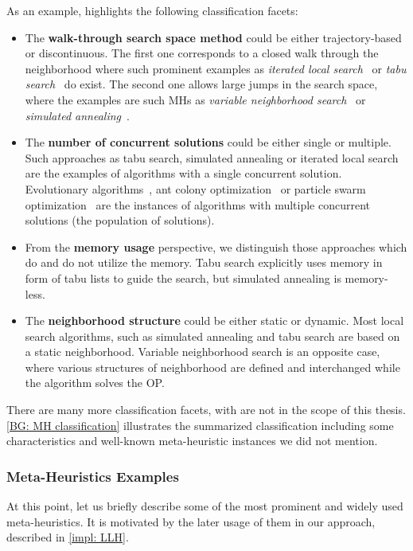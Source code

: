 As an example, \cite{birattari2001classification} highlights the following classification facets:
\begin{itemize}
	\item The \textbf{walk-through search space method} could be either trajectory-based or discontinuous. The first one corresponds to a closed walk through the neighborhood where such prominent examples as \textit{iterated local search}~\cite{lourencco2003iterated} or \textit{tabu search}~\cite{glover1989tabu} do exist. The second one allows large jumps in the search space, where the examples are such MHs as \textit{variable neighborhood search}~\cite{hansen2003variable} or \textit{simulated annealing}~\cite{kirkpatrick1983optimization}.
	
	\item The \textbf{number of concurrent solutions} could be either single or multiple. Such approaches as tabu search, simulated annealing or iterated local search are the examples of algorithms with a single concurrent solution. Evolutionary algorithms~\cite{eiben2015evolutionary}, ant colony optimization~\cite{dorigo2007ant} or particle swarm optimization~\cite{kennedy1995particle} are the instances of algorithms with multiple concurrent solutions (the population of solutions).
	
	\item From the \textbf{memory usage} perspective, we distinguish those approaches which do and do not utilize the memory. Tabu search explicitly uses memory in form of tabu lists to guide the search, but simulated annealing is memory-less.
	
	\item The \textbf{neighborhood structure} could be either static or dynamic. Most local search algorithms, such as simulated annealing and tabu search are based on a static neighborhood. Variable neighborhood search is an opposite case, where various structures of neighborhood are defined and interchanged while the algorithm solves the OP.
\end{itemize}

There are many more classification facets, with are not in the scope of this thesis. \cref{BG: MH classification} illustrates the summarized classification including some characteristics and well-known meta-heuristic instances we did not mention.


\subsubsection{Meta-Heuristics Examples}\label{BG: MH Examples}
At this point, let us briefly describe some of the most prominent and widely used meta-heuristics. It is motivated by the later usage of them in our approach, described in \cref{impl: LLH}.

